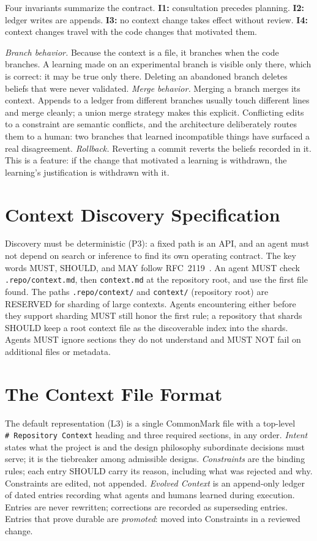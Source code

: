 \documentclass[sigconf,screen]{acmart}
\newcommand{\ctx}{\texttt{context.md}}
\begin{document}
Four invariants summarize the contract. \textbf{I1:} consultation precedes
planning. \textbf{I2:} ledger writes are appends. \textbf{I3:} no context change
takes effect without review. \textbf{I4:} context changes travel with the code
changes that motivated them.

\emph{Branch behavior.} Because the context is a file, it branches when the code
branches. A learning made on an experimental branch is visible only there, which
is correct: it may be true only there. Deleting an abandoned branch deletes
beliefs that were never validated. \emph{Merge behavior.} Merging a branch merges
its context. Appends to a ledger from different branches usually touch different
lines and merge cleanly; a union merge strategy makes this explicit. Conflicting
edits to a constraint are semantic conflicts, and the architecture deliberately
routes them to a human: two branches that learned incompatible things have
surfaced a real disagreement. \emph{Rollback.} Reverting a commit reverts the
beliefs recorded in it. This is a feature: if the change that motivated a learning
is withdrawn, the learning's justification is withdrawn with it.

\section{Context Discovery Specification}\label{sec:discovery}
Discovery must be deterministic (P3): a fixed path is an API, and an agent must not
depend on search or inference to find its own operating contract. The key words
MUST, SHOULD, and MAY follow RFC~2119~\cite{rfc2119}. An agent MUST check
\texttt{.repo/context.md}, then \ctx{} at the repository root, and use the first
file found. The paths \texttt{.repo/context/} and \texttt{context/} (repository
root) are RESERVED for sharding of large contexts. Agents encountering either
before they support sharding MUST still honor the first rule; a repository that
shards SHOULD keep a root context file as the discoverable index into the shards.
Agents MUST ignore sections they do not understand and MUST NOT fail on additional
files or metadata.

\section{The Context File Format}\label{sec:format}
The default representation (L3) is a single CommonMark file with a top-level
\texttt{\#~Repository Context} heading and three required sections, in any order.
\emph{Intent} states what the project is and the design philosophy subordinate
decisions must serve; it is the tiebreaker among admissible designs.
\emph{Constraints} are the binding rules; each entry SHOULD carry its reason,
including what was rejected and why. Constraints are edited, not appended.
\emph{Evolved Context} is an append-only ledger of dated entries recording what
agents and humans learned during execution. Entries are never rewritten;
corrections are recorded as superseding entries. Entries that prove durable are
\emph{promoted}: moved into Constraints in a reviewed change.
\end{document}
